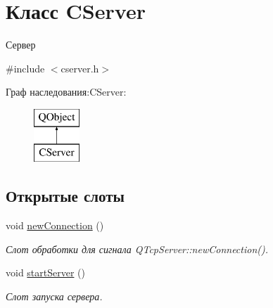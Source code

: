 \hypertarget{class_c_server}{}\section{Класс C\+Server}
\label{class_c_server}


Сервер  




{\ttfamily \#include $<$cserver.\+h$>$}

Граф наследования\+:C\+Server\+:\begin{figure}[H]
\begin{center}
\leavevmode
\includegraphics[height=2.000000cm]{class_c_server}
\end{center}
\end{figure}
\subsection*{Открытые слоты}
\begin{DoxyCompactItemize}
\item 
void \hyperlink{class_c_server_a4e5b127e1eb4342a130018d9ff921735}{new\+Connection} ()
\begin{DoxyCompactList}\small\item\em Слот обработки для сигнала Q\+Tcp\+Server\+::new\+Connection(). \end{DoxyCompactList}\item 
void \hyperlink{class_c_server_adbc93cef317eac86a09a0b7067c96cc1}{start\+Server} ()
\begin{DoxyCompactList}\small\item\em Слот запуска сервера. \end{DoxyCompactList}\end{DoxyCompactItemize}
